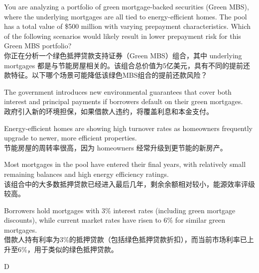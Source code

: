 \documentclass{article}
\newcounter{question} %
\begin{document}
    \begin{question}
        You are analyzing a portfolio of green mortgage-backed securities (Green MBS), where the underlying mortgages are all tied to energy-efficient homes. The pool has a total value of \$500 million with varying prepayment characteristics. Which of the following scenarios would likely result in lower prepayment risk for this Green MBS portfolio?
        \\你正在分析一个绿色抵押贷款支持证券（Green MBS）组合，其中 underlying mortgages 都是与节能房屋相关的。该组合总价值为5亿美元，具有不同的提前还款特征。以下哪个场景可能降低该绿色MBS组合的提前还款风险？
    \end{question}
        
        \begin{choices}
            \item The government introduces new environmental guarantees that cover both interest and principal payments if borrowers default on their green mortgages.\\
            政府引入新的环境担保，如果借款人违约，将覆盖利息和本金支付。
            
            \item Energy-efficient homes are showing high turnover rates as homeowners frequently upgrade to newer, more efficient properties.\\
            节能房屋的周转率很高，因为 homeowners 经常升级到更节能的新房产。
            
            \item Most mortgages in the pool have entered their final years, with relatively small remaining balances and high energy efficiency ratings.\\
            该组合中的大多数抵押贷款已经进入最后几年，剩余余额相对较小，能源效率评级较高。
            
            \item Borrowers hold mortgages with 3\% interest rates (including green mortgage discounts), while current market rates have risen to 6\% for similar green mortgages.\\
            借款人持有利率为3\%的抵押贷款（包括绿色抵押贷款折扣），而当前市场利率已上升至6\%，用于类似的绿色抵押贷款。
        \end{choices}
        
        \begin{correctanswer}
        D
        \end{correctanswer}
        
\end{document}
